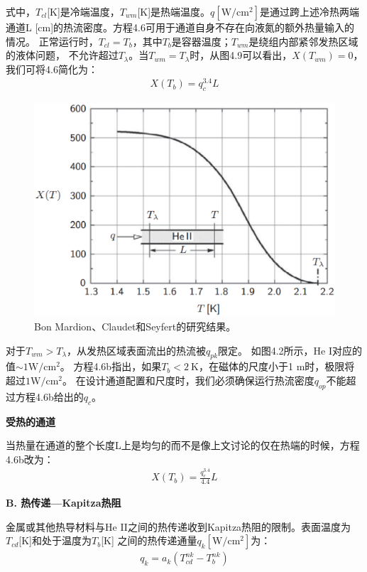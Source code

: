 式中，$T_{cl}$[K]是冷端温度，$T_{wm}$[K]是热端温度。$q[\mathrm{W/cm^2}]$是通过跨上述冷热两端
通道L [cm]的热流密度。方程4.6可用于通道自身不存在向液氮的额外热量输入的情况。
正常运行时，$T_{cl} = T_b$，其中$T_{b}$是容器温度；$T_{wm}$是绕组内部紧邻发热区域的液体问题，
不允许超过$T_\lambda$。当$T_{wm}=T_\lambda$时，从图4.9可以看出，$X(T_{wm})=0$，我们可将4.6简化为：
\begin{align*}%
X(T_b)=q_{c}^{3.4}L \tag{4.6b}
\end{align*}

\begin{figure}[htbp]
	\centering
	\includegraphics[scale=0.5]{chpt4/figs/fig4.9.eps}
	\caption{Bon Mardion、Claudet和Seyfert的研究结果。}
\end{figure}

对于$T_{wm} > T_\lambda$，从发热区域表面流出的热流被$q_{pk}$限定。
如图4.2所示，He I对应的值$\sim 1 \mathrm{W/cm^2}$。
方程4.6b指出，如果$T_b<2\ \mathrm{K}$，在磁体的尺度小于1 m时，极限将超过$1 \mathrm{W/cm^2}$。
在设计通道配置和尺度时，我们必须确保运行热流密度$q_{op}$不能超过方程4.6b给出的$q_c$。

\textbf{受热的通道}

当热量在通道的整个长度L上是均匀的而不是像上文讨论的仅在热端的时候，方程4.6b改为：
\begin{align*}%
X(T_b)=\frac{q_{c}^{3.4}}{4.4}L \tag{4.6c}
\end{align*}

\textbf{B. 热传递---Kapitza热阻}

金属或其他热导材料与He II之间的热传递收到Kapitza热阻的限制。表面温度为$T_{cd}$[K]和处于温度为$T_b$[K]
之间的热传递通量$q_k[\mathrm{W/cm^2}]$为：
\begin{align}%
q_k=a_k(T_{cd}^{nk}-T_{b}^{nk})
\end{align}

